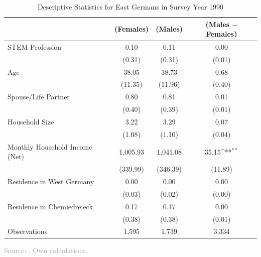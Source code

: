 \documentclass[11pt, aspectratio=1610, xcolor={dvipsnames}]{beamer}
\def\sym#1{\ifmmode^{#1}\else\(^{#1}\)\fi}
\begin{document}
	\begin{frame}
		\frametitle{}
		{\linespread{1}\tiny
			\begin{table}[h]
				\centering
				\caption{Descriptive Statistics for East Germans in Survey Year 1990}
				\label{tab:descriptives}
				\begin{tabular}{l*{3}{c}}
					\toprule
					& (Females) & (Males) & (Males $-$ Females) \\
					\midrule
					STEM Profession     &        0.10&             0.11&          0.00      \\
					&     (0.31)&           (0.31)&           (0.01)\\
					\addlinespace
					Age                 &      38.05&          38.73&        0.68 \\
					&     (11.35)&        (11.96)         &      (0.40)\\
					\addlinespace
					Spouse/Life Partner &        0.80&            0.81&        0.01       \\
					&      (0.40)&          (0.39)&         (0.01)\\
					\addlinespace
					Household Size      &        3.22&         3.29&           0.07        \\
					&          (1.08)&       (1.10)        &      (0.04)\\
					\addlinespace
					Monthly Household Income (Net)&     1,005.93&       1,041.08&      35.15\sym{**} \\
					&    (339.99)&      (346.39)&         (11.89)\\
					\addlinespace
					Residence in West Germany&        0.00&        0.00&         0.00         \\
					&         (0.03)&       (0.02)&          (0.00)\\
					\addlinespace
					Residence in Chemiedreieck&        0.17&        0.17&         0.00     \\
					&          (0.38)&       (0.38)&            (0.01)\\
					\midrule
					Observations        &        1,595&             1,739&            3,334               \\
					\bottomrule
				\end{tabular}
			\end{table}
		}
		
		{\scriptsize
			\textcolor{darkgray}{Source: \cite{SOEP2023}. Own calculations.}
		}
		
	\end{frame}
	
\end{document}
